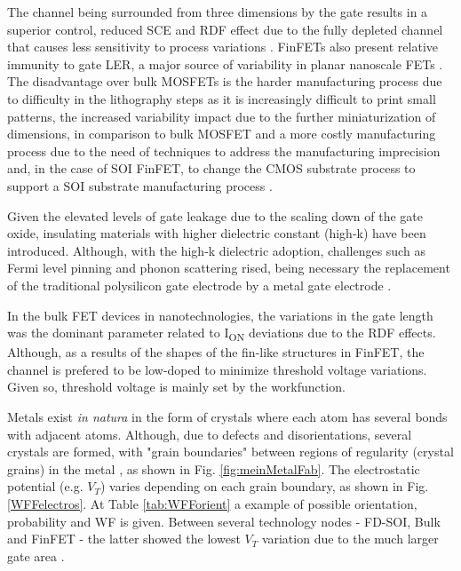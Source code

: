 \documentclass[diss,pgmicro,english]{iiufrgs}
\begin{document}
The channel being surrounded from three dimensions by the gate results in a superior control, reduced SCE and RDF effect due to the fully depleted channel that causes less sensitivity to process variations \cite{taur2013fundamentals}. FinFETs also present relative immunity to gate LER, a major source of variability in planar nanoscale FETs \cite{finfetchar1}. The disadvantage over bulk MOSFETs is the harder manufacturing process due to difficulty in the lithography steps as it is increasingly difficult to print small patterns, the increased variability impact due to the further miniaturization of dimensions, in comparison to bulk MOSFET and a more costly manufacturing process due to the need of techniques to address the manufacturing imprecision and, in the case of SOI FinFET, to change the CMOS substrate process to support a SOI substrate manufacturing process \cite{finfetchar1} \cite{finfetdis}.

Given the elevated levels of gate leakage due to the scaling down of the gate oxide, insulating materials with higher dielectric constant (high-k) have been introduced. Although, with the high-k dielectric adoption, challenges such as Fermi level pinning \cite{hobbs2004fermi} and phonon scattering \cite{gusev2006advanced} rised, being necessary the replacement of the traditional polysilicon gate electrode by a metal gate electrode \cite{gusev2001ultrathin, datta2003high}.

In the bulk FET devices in nanotechnologies, the variations in the gate length was the dominant parameter related to I\textsubscript{ON} deviations due to the RDF effects. Although, as a results of the shapes of the fin-like structures in FinFET, the channel is prefered to be low-doped to minimize threshold voltage variations. Given so, threshold voltage is mainly set by the workfunction.

Metals exist \textit{in natura} in the form of crystals where each atom has several bonds with adjacent atoms. Although, due to defects and disorientations, several crystals are formed, with "grain boundaries" between regions of regularity (crystal grains) in the metal \cite{dadgour2008statistical}, as shown in Fig. \ref{fig:meinMetalFab}. The electrostatic potential (e.g. $V_T$) varies depending on each grain boundary, as shown in Fig. \ref{WFFelectros}. At Table \ref{tab:WFForient} a example of possible orientation, probability and WF is given. Between several technology nodes - FD-SOI, Bulk and FinFET - the latter showed the lowest $V_T$ variation due to the much larger gate area \cite{dadgour2008statistical}.
\end{document}
